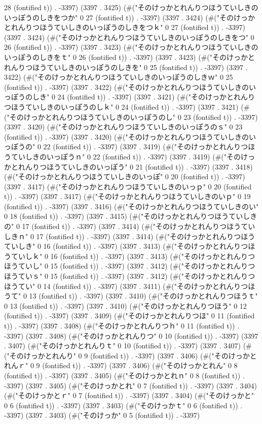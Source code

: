 28 (fontified t)) . -3397) (3397 . 3425) (#("そのけっかとれんりつほうていしきのいっぽうのしきをつか" 0 27 (fontified t)) . -3397) (3397 . 3424) (#("そのけっかとれんりつほうていしきのいっぽうのしきをつｋ" 0 27 (fontified t)) . -3397) (3397 . 3424) (#("そのけっかとれんりつほうていしきのいっぽうのしきをつ" 0 26 (fontified t)) . -3397) (3397 . 3423) (#("そのけっかとれんりつほうていしきのいっぽうのしきをｔ" 0 26 (fontified t)) . -3397) (3397 . 3423) (#("そのけっかとれんりつほうていしきのいっぽうのしきを" 0 25 (fontified t)) . -3397) (3397 . 3422) (#("そのけっかとれんりつほうていしきのいっぽうのしきｗ" 0 25 (fontified t)) . -3397) (3397 . 3422) (#("そのけっかとれんりつほうていしきのいっぽうのしき" 0 24 (fontified t)) . -3397) (3397 . 3421) (#("そのけっかとれんりつほうていしきのいっぽうのしｋ" 0 24 (fontified t)) . -3397) (3397 . 3421) (#("そのけっかとれんりつほうていしきのいっぽうのし" 0 23 (fontified t)) . -3397) (3397 . 3420) (#("そのけっかとれんりつほうていしきのいっぽうのｓ" 0 23 (fontified t)) . -3397) (3397 . 3420) (#("そのけっかとれんりつほうていしきのいっぽうの" 0 22 (fontified t)) . -3397) (3397 . 3419) (#("そのけっかとれんりつほうていしきのいっぽうｎ" 0 22 (fontified t)) . -3397) (3397 . 3419) (#("そのけっかとれんりつほうていしきのいっぽう" 0 21 (fontified t)) . -3397) (3397 . 3418) (#("そのけっかとれんりつほうていしきのいっぽ" 0 20 (fontified t)) . -3397) (3397 . 3417) (#("そのけっかとれんりつほうていしきのいっｐ" 0 20 (fontified t)) . -3397) (3397 . 3417) (#("そのけっかとれんりつほうていしきのいｐ" 0 19 (fontified t)) . -3397) (3397 . 3416) (#("そのけっかとれんりつほうていしきのい" 0 18 (fontified t)) . -3397) (3397 . 3415) (#("そのけっかとれんりつほうていしきの" 0 17 (fontified t)) . -3397) (3397 . 3414) (#("そのけっかとれんりつほうていしきｎ" 0 17 (fontified t)) . -3397) (3397 . 3414) (#("そのけっかとれんりつほうていしき" 0 16 (fontified t)) . -3397) (3397 . 3413) (#("そのけっかとれんりつほうていしｋ" 0 16 (fontified t)) . -3397) (3397 . 3413) (#("そのけっかとれんりつほうていし" 0 15 (fontified t)) . -3397) (3397 . 3412) (#("そのけっかとれんりつほうていｓ" 0 15 (fontified t)) . -3397) (3397 . 3412) (#("そのけっかとれんりつほうてい" 0 14 (fontified t)) . -3397) (3397 . 3411) (#("そのけっかとれんりつほうて" 0 13 (fontified t)) . -3397) (3397 . 3410) (#("そのけっかとれんりつほうｔ" 0 13 (fontified t)) . -3397) (3397 . 3410) (#("そのけっかとれんりつほう" 0 12 (fontified t)) . -3397) (3397 . 3409) (#("そのけっかとれんりつほ" 0 11 (fontified t)) . -3397) (3397 . 3408) (#("そのけっかとれんりつｈ" 0 11 (fontified t)) . -3397) (3397 . 3408) (#("そのけっかとれんりつ" 0 10 (fontified t)) . -3397) (3397 . 3407) (#("そのけっかとれんりｔ" 0 10 (fontified t)) . -3397) (3397 . 3407) (#("そのけっかとれんり" 0 9 (fontified t)) . -3397) (3397 . 3406) (#("そのけっかとれんｒ" 0 9 (fontified t)) . -3397) (3397 . 3406) (#("そのけっかとれん" 0 8 (fontified t)) . -3397) (3397 . 3405) (#("そのけっかとれｎ" 0 8 (fontified t)) . -3397) (3397 . 3405) (#("そのけっかとれ" 0 7 (fontified t)) . -3397) (3397 . 3404) (#("そのけっかとｒ" 0 7 (fontified t)) . -3397) (3397 . 3404) (#("そのけっかと" 0 6 (fontified t)) . -3397) (3397 . 3403) (#("そのけっかｔ" 0 6 (fontified t)) . -3397) (3397 . 3403) (#("そのけっか" 0 5 (fontified t)) . -3397) 